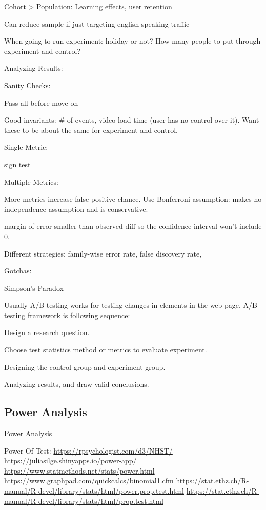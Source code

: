 \documentclass[]{book}
\begin{document}
Cohort \textgreater{} Population: Learning effects, user retention

Can reduce sample if just targeting english speaking traffic

When going to run experiment: holiday or not? How many people to put through experiment and control?

Analyzing Results:

Sanity Checks:

Pass all before move on

Good invariants: \# of events, video load time (user has no control over it). Want these to be about the same for experiment and control.

Single Metric:

sign test

Multiple Metrics:

More metrics increase false positive chance. Use Bonferroni assumption: makes no independence assumption and is conservative.

margin of error smaller than observed diff so the confidence interval won't include 0.

Different strategies: family-wise error rate, false discovery rate,

Gotchas:

Simpson's Paradox

Usually A/B testing works for testing changes in elements in the web page. A/B testing framework is following sequence:

Design a research question.

Choose test statistics method or metrics to evaluate experiment.

Designing the control group and experiment group.

Analyzing results, and draw valid conclusions.

\hypertarget{power-analysis}{%
\subsection{Power Analysis}\label{power-analysis}}

\href{https://www.statmethods.net/stats/power.html}{Power Analysis}

Power-Of-Test: \url{https://rpsychologist.com/d3/NHST/} \url{https://juliasilge.shinyapps.io/power-app/} \url{https://www.statmethods.net/stats/power.html} \url{https://www.graphpad.com/quickcalcs/binomial1.cfm} \url{https://stat.ethz.ch/R-manual/R-devel/library/stats/html/power.prop.test.html} \url{https://stat.ethz.ch/R-manual/R-devel/library/stats/html/prop.test.html}
\end{document}
